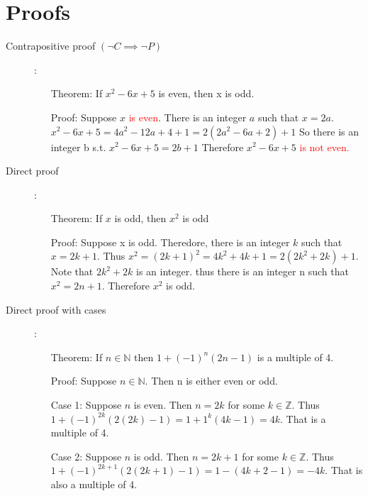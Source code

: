 \documentclass[12pt]{article}
\begin{document}
\section{Proofs}

\begin{description}

\item[Contrapositive proof $(\neg C \implies \neg P)$]:
\begin{enumerate}
\item[Theorem:] If $x^2 -6x +5$ is even, then x is odd.

\item[Proof:] Suppose $x$ \textcolor{red}{is even}. There is an integer $a$ such that $x = 2a$.$x^2 -6x +5 = 4a^2 -12a + 4 +1 = 2(2a^2 -6a +2) +1$ So there is an integer b s.t. $x^2 -6x +5 = 2b +1$ Therefore $x^2 -6x +5$ \textcolor{red}{is not even.}

\end{enumerate}


\item[Direct proof]: 
\begin{enumerate}
\item[Theorem:] If $x$ is odd, then $x^2$ is odd

\item[Proof:] Suppose x is odd. Theredore, there is an integer $k$ such that $x = 2k + 1$. Thus $x^2 =(2k + 1)^2= 4k^2 + 4k +1 = 2(2k^2 +2k) +1$. Note that $2k^2 +2k$ is an integer. thus there is an integer n such that $x^2 = 2n+1$. Therefore $x^2$ is odd.

\end{enumerate}

\item[Direct proof with cases]:
\begin{enumerate}
\item[Theorem:] If $n \in \mathbb{N}$ then $1 + (-1)^n(2n-1)$ is a multiple of 4.

\item[Proof:] Suppose $n \in \mathbb{N}$. Then n is either even or odd.

\item[Case 1:] Suppose $n$ is even. Then $n=2k$ for some $k \in \mathbb{Z}$. Thus $1 + (-1)^{2k}(2(2k)-1) = 1 +1^k(4k-1) = 4k$. That is a multiple of 4.

\item[Case 2:] Suppose $n$ is odd.  Then $n=2k +1$ for some $k \in \mathbb{Z}$. Thus $1 + (-1)^{2k +1}(2(2k +1)-1) = 1 -(4k +2 -1) = -4k$. That is also a multiple of 4. 
\end{enumerate}


\end{description}
\end{document}
